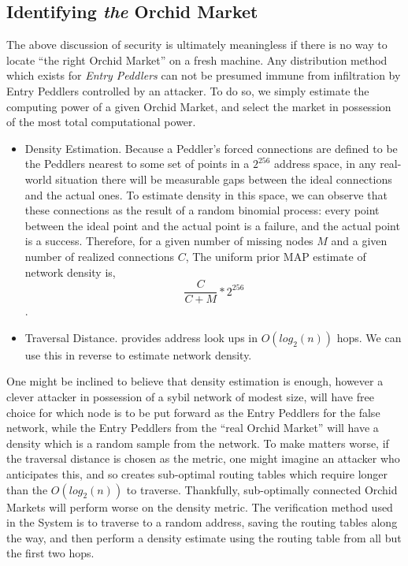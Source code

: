 \subsection{Identifying \emph{the} Orchid Market}

The above discussion of security is ultimately meaningless if there is no way to locate ``the right Orchid Market'' on a fresh machine. Any distribution method which exists for \emph{Entry Peddlers} can not be presumed immune from infiltration by Entry Peddlers controlled by an attacker. To do so, we simply estimate the computing power of a given Orchid Market, and select the market in possession of the most total computational power.

\begin{itemize}
\item Density Estimation. Because a Peddler's forced connections are defined to be the Peddlers nearest to some set of points in a $2^{256}$ address space, in any real-world situation there will be measurable gaps between the ideal connections and the actual ones. To estimate density in this space, we can observe that these connections as the result of a random binomial process: every point between the ideal point and the actual point is a failure, and the actual point is a success. Therefore, for a given number of missing nodes $M$ and a given number of realized connections $C$, The uniform prior MAP estimate of network density is, 								$$\frac{C}{C + M} * 2^{256}$$.
\item Traversal Distance. \TOM{} provides address look ups in $O(log_2(n))$ hops. We can use this in reverse to estimate network density.
\end{itemize}

One might be inclined to believe that density estimation is enough, however a clever attacker in possession of a sybil network of modest size, will have free choice for which node is to be put forward as the Entry Peddlers for the false network, while the Entry Peddlers from the ``real Orchid Market'' will have a density which is a random sample from the network. To make matters worse, if the traversal distance is chosen as the metric, one might imagine an attacker who anticipates this, and so creates sub-optimal routing tables which require longer than the $O(log_2(n))$ to traverse. Thankfully, sub-optimally connected Orchid Markets will perform worse on the density metric. The verification method used in the \Orchid{} System is to traverse to a random address, saving the routing tables along the way, and then perform a density estimate using the routing table from all but the first two hops.


